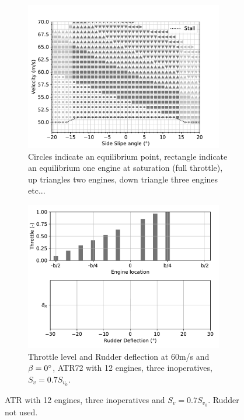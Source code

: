 \begin{figure}[hbt!]
	\centering
	\begin{subfigure}{0.49\textwidth}
		\includegraphics[width=0.95\textwidth]{DEPoriginalMapBetaVelfin07Eng15RudTrue}
		\caption{Circles indicate an equilibrium point, rectangle indicate an equilibrium one engine at saturation (full throttle), up triangles two engines, down triangle three engines etc...}
		\label{fig:DEPoriginalfin07_15engine}
	\end{subfigure}
	\begin{subfigure}{0.49\textwidth}
		\includegraphics[width=0.95\textwidth]{DeflDEPoriginalfin07Eng15RudTrue}
		\caption{Throttle level and Rudder deflection at 60m/s and $\beta=0\degree$, ATR72 with 12 engines, three inoperatives, $S_v=0.7S_{v_0}$.}
		\label{fig:DeflDEPoriginalfin07_15Eng}
	\end{subfigure}
	\caption{ATR with 12 engines, three inoperatives and $S_v=0.7S_{v_0}$. Rudder not used.}\label{fig:DEPfin07_15enginesMap+Defl}
\end{figure}

